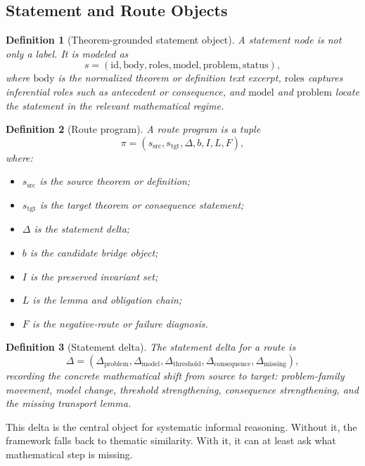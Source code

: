 \documentclass[11pt]{article}
\newtheorem{definition}{Definition}
\begin{document}
\subsection{Statement and Route Objects}

\begin{definition}[Theorem-grounded statement object]
A statement node is not only a label. It is modeled as
\[
s = (\mathrm{id}, \mathrm{body}, \mathrm{roles}, \mathrm{model}, \mathrm{problem}, \mathrm{status}),
\]
where $\mathrm{body}$ is the normalized theorem or definition text excerpt, $\mathrm{roles}$ captures inferential roles such as antecedent or consequence, and $\mathrm{model}$ and $\mathrm{problem}$ locate the statement in the relevant mathematical regime.
\end{definition}

\begin{definition}[Route program]
A route program is a tuple
\[
\pi = (s_{\mathrm{src}}, s_{\mathrm{tgt}}, \Delta, b, I, L, F),
\]
where:
\begin{itemize}[leftmargin=*,itemsep=0.2em]
\item $s_{\mathrm{src}}$ is the source theorem or definition;
\item $s_{\mathrm{tgt}}$ is the target theorem or consequence statement;
\item $\Delta$ is the statement delta;
\item $b$ is the candidate bridge object;
\item $I$ is the preserved invariant set;
\item $L$ is the lemma and obligation chain;
\item $F$ is the negative-route or failure diagnosis.
\end{itemize}
\end{definition}

\begin{definition}[Statement delta]
The statement delta for a route is
\[
\Delta = (\Delta_{\mathrm{problem}}, \Delta_{\mathrm{model}}, \Delta_{\mathrm{threshold}}, \Delta_{\mathrm{consequence}}, \Delta_{\mathrm{missing}}),
\]
recording the concrete mathematical shift from source to target: problem-family movement, model change, threshold strengthening, consequence strengthening, and the missing transport lemma.
\end{definition}

This delta is the central object for systematic informal reasoning. Without it, the framework falls back to thematic similarity. With it, it can at least ask what mathematical step is missing.
\end{document}
